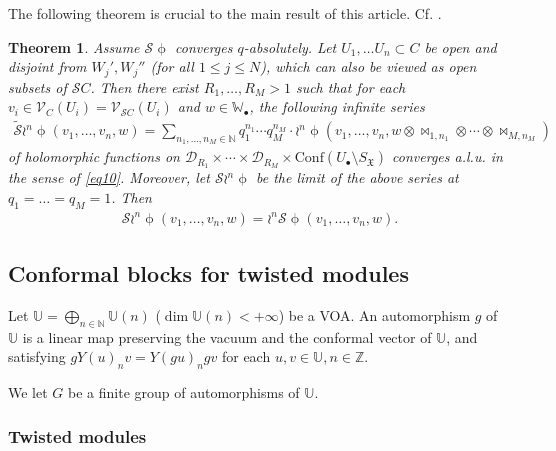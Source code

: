 \documentclass[12pt,a4paper,notitlepage]{article}
\theoremstyle{definition}
\theoremstyle{plain}
\newtheorem{thm}[df]{Theorem}
\newcommand{\fk}{\mathfrak}
\newcommand{\mc}{\mathcal}
\newcommand{\wtd}{\widetilde}
\newcommand{\Conf}{\mathrm{Conf}}
\newcommand{\scr}{\mathscr}
\newcommand{\SX}{{S_{\fk X}}}
\newcommand{\blt}{\bullet}
\newcommand{\Ubb}{\mathbb U}
\newcommand{\Wbb}{\mathbb W}
\newcommand{\Nbb}{\mathbb N}
\newcommand{\Zbb}{\mathbb Z}
\numberwithin{equation}{subsection}
\begin{document}
The following theorem is crucial to the main result of this article. Cf. \cite[Thm. 9.1]{Gui21b}.

\begin{thm}\label{lb19}
Assume $\scr S\upphi$ converges $q$-absolutely. Let $U_1,\dots U_n\subset C$ be open and disjoint from $W_j',W_j''$ (for all $1\leq j\leq N$), which can also be viewed as open subsets of $\scr SC$. Then there exist $R_1,\dots,R_M>1$ such that for each $v_i\in\scr V_C(U_i)=\scr V_{\scr SC}(U_i)$ and $w\in\Wbb_\blt$, the following infinite series
\begin{align*}
\wtd{\mc S}\wr^n\upphi(v_1,\dots,v_n,w)=\sum_{n_1,\dots,n_M\in\Nbb}q_1^{n_1}\cdots q_M^{n_M}\cdot\wr^n\upphi(v_1,\dots,v_n,w\otimes\bowtie_{1,n_1}\otimes\cdots\otimes\bowtie_{M,n_M})	
\end{align*}
of holomorphic functions on $\mc D_{R_1}\times\cdots\times\mc D_{R_M}\times\Conf(U_\blt\setminus\SX)$ converges a.l.u. in the sense of \eqref{eq10}. Moreover, let $\scr S\wr^n\upphi$ be the limit of the above series at $q_1=\dots=q_M=1$.  Then
\begin{align}
\scr S\wr^n\upphi(v_1,\dots,v_n,w)=\wr^n\scr S\upphi(v_1,\dots,v_n,w).	
\end{align}
\end{thm}



\subsection{Conformal blocks for twisted modules}\label{lb22}


Let $\Ubb=\bigoplus_{n\in\Nbb}\Ubb(n)$ ($\dim\Ubb(n)<+\infty$) be a  VOA. An automorphism $g$ of $\Ubb$ is a linear map preserving the vacuum and the conformal vector of $\Ubb$, and satisfying $gY(u)_nv=Y(gu)_ngv$ for each $u,v\in\Ubb,n\in\Zbb$.

We let $G$ be a finite group of automorphisms of $\Ubb$.


\subsubsection{Twisted modules}\label{lb34}
\end{document}
